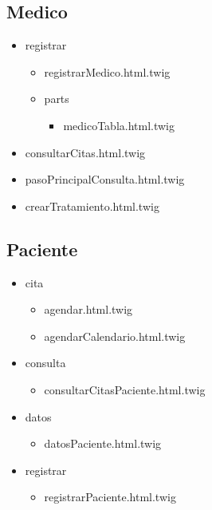 		\subsection{Medico}
		\begin{itemize}
			\item registrar
			\begin{itemize}
			\item registrarMedico.html.twig
			\item parts
			\begin{itemize}
				\item medicoTabla.html.twig
			\end{itemize}
			\end{itemize}
			\item consultarCitas.html.twig
			\item pasoPrincipalConsulta.html.twig 
			\item crearTratamiento.html.twig
			
		\end{itemize}
		\subsection{Paciente}
		\begin{itemize}
			\item cita
			\begin{itemize}
				\item agendar.html.twig
				\item agendarCalendario.html.twig
			\end{itemize}

			\item consulta
			\begin{itemize}
				\item consultarCitasPaciente.html.twig
			\end{itemize}
			
			
			\item datos
			\begin{itemize}
			\item datosPaciente.html.twig
			\end{itemize}
			
			\item registrar
			\begin{itemize}
			\item registrarPaciente.html.twig
			\end{itemize}
			
		\end{itemize}
